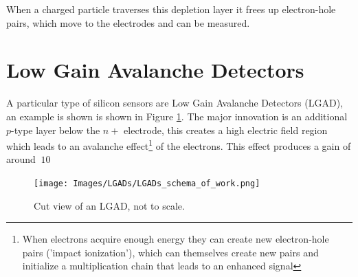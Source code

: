 When a charged particle traverses this depletion layer it frees up electron-hole pairs, which move to the electrodes and can be measured. 

\section{Low Gain Avalanche Detectors}

A particular type of silicon sensors are Low Gain Avalanche Detectors (LGAD), an example is shown is shown in Figure \ref{fig:LGADs_schema}. The major innovation is an additional $p$-type layer below the $n+$ electrode, this creates a high electric field region which leads to an avalanche effect\footnote[2]{When electrons acquire enough energy they can create new electron-hole pairs ('impact ionization'), which can themselves create new pairs and initialize a multiplication chain that leads to an enhanced signal} of the electrons. This effect produces a gain of around $~10$  

\begin{figure}[!ht]
    \centering
    \texttt{[image: Images/LGADs/LGADs\_schema\_of\_work.png]}
    \caption{Cut view of an LGAD, not to scale.}
    \label{fig:LGADs_schema}
\end{figure}





